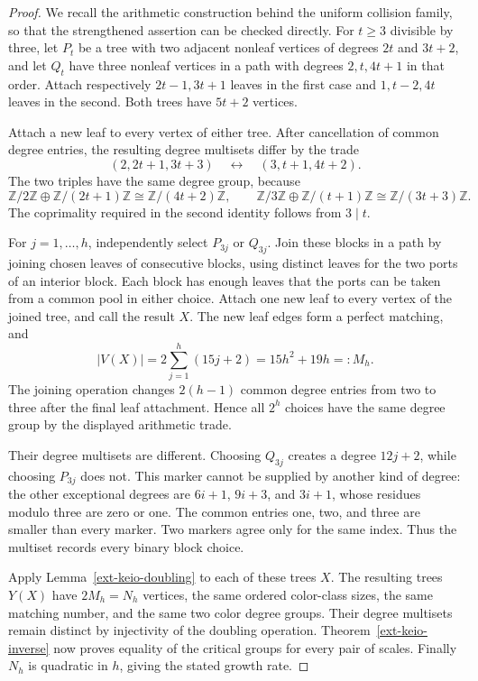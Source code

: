 \documentclass[11pt,a4paper]{article}
\theoremstyle{definition}\newtheorem{definition}[theorem]{Definition}
\theoremstyle{remark}\newtheorem{remark}[theorem]{Remark}
\newcommand{\Z}{\mathbb Z}\newcommand{\Q}{\mathbb Q}\newcommand{\F}{\mathbb F}
\numberwithin{equation}{section}
\begin{document}
\begin{proof}
We recall the arithmetic construction behind the uniform collision family,
so that the strengthened assertion can be checked directly.  For $t\geq3$
divisible by three, let $P_t$ be a tree with two adjacent nonleaf vertices of
degrees $2t$ and $3t+2$, and let $Q_t$ have three nonleaf vertices in a path
with degrees $2,t,4t+1$ in that order.  Attach respectively $2t-1,3t+1$
leaves in the first case and $1,t-2,4t$ leaves in the second.  Both trees have
$5t+2$ vertices.

Attach a new leaf to every vertex of either tree.  After cancellation of
common degree entries, the resulting degree multisets differ by the trade
\[
 (2,2t+1,3t+3)\quad\longleftrightarrow\quad(3,t+1,4t+2).
\]
The two triples have the same degree group, because
\[
 \Z/2\Z\oplus\Z/(2t+1)\Z\cong\Z/(4t+2)\Z,
 \qquad
 \Z/3\Z\oplus\Z/(t+1)\Z\cong\Z/(3t+3)\Z.
\]
The coprimality required in the second identity follows from $3\mid t$.

For $j=1,\ldots,h$, independently select $P_{3j}$ or $Q_{3j}$.  Join these
blocks in a path by joining chosen leaves of consecutive blocks, using
distinct leaves for the two ports of an interior block.  Each block has
enough leaves that the ports can be taken from a common pool in either
choice.  Attach one new leaf to every vertex of the joined tree, and call the
result $X$.  The new leaf edges form a perfect matching, and
\[
 |V(X)|=2\sum_{j=1}^h(15j+2)=15h^2+19h=:M_h.
\]
The joining operation changes $2(h-1)$ common degree entries from two to
three after the final leaf attachment.  Hence all $2^h$ choices have the same
degree group by the displayed arithmetic trade.

Their degree multisets are different.  Choosing $Q_{3j}$ creates a degree
$12j+2$, while choosing $P_{3j}$ does not.  This marker cannot be supplied by
another kind of degree: the other exceptional degrees are $6i+1$, $9i+3$,
and $3i+1$, whose residues modulo three are zero or one.  The common entries
one, two, and three are smaller than every marker.  Two markers agree only
for the same index.
Thus the multiset records every binary block choice.

Apply Lemma~\ref{ext-keio-doubling} to each of these trees $X$.  The resulting
trees $Y(X)$ have $2M_h=N_h$ vertices, the same ordered color-class sizes,
the same matching number, and the same two color degree groups.  Their degree
multisets remain distinct by injectivity of the doubling operation.
Theorem~\ref{ext-keio-inverse} now proves equality of the critical groups for
every pair of scales.  Finally $N_h$ is quadratic in $h$, giving the stated
growth rate.
\end{proof}
\end{document}
